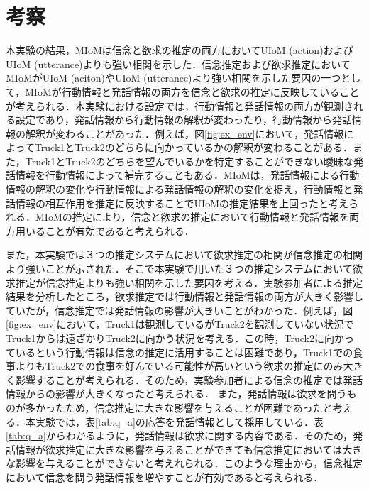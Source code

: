\chapter{考察}
\par
本実験の結果，MIoMは信念と欲求の推定の両方においてUIoM (action)およびUIoM (utterance)よりも強い相関を示した．信念推定および欲求推定においてMIoMがUIoM (aciton)やUIoM (utterance)より強い相関を示した要因の一つとして，MIoMが行動情報と発話情報の両方を信念と欲求の推定に反映していることが考えられる．本実験における設定では，行動情報と発話情報の両方が観測される設定であり，発話情報から行動情報の解釈が変わったり，行動情報から発話情報の解釈が変わることがあった．例えば，図\ref{fig:ex_env}において，発話情報によってTruck1とTruck2のどちらに向かっているかの解釈が変わることがある．また，Truck1とTruck2のどちらを望んでいるかを特定することができない曖昧な発話情報を行動情報によって補完することもある．MIoMは，発話情報による行動情報の解釈の変化や行動情報による発話情報の解釈の変化を捉え，行動情報と発話情報の相互作用を推定に反映することでUIoMの推定結果を上回ったと考えられる．MIoMの推定により，信念と欲求の推定において行動情報と発話情報を両方用いることが有効であると考えられる．

\par
また，本実験では３つの推定システムにおいて欲求推定の相関が信念推定の相関より強いことが示された．そこで本実験で用いた３つの推定システムにおいて欲求推定が信念推定よりも強い相関を示した要因を考える．実験参加者による推定結果を分析したところ，欲求推定では行動情報と発話情報の両方が大きく影響していたが，信念推定では発話情報の影響が大きいことがわかった．例えば，図\ref{fig:ex_env}において，Truck1は観測しているがTruck2を観測していない状況でTruck1からは遠ざかりTruck2に向かう状況を考える．この時，Truck2に向かっているという行動情報は信念の推定に活用することは困難であり，Truck1での食事よりもTruck2での食事を好んでいる可能性が高いという欲求の推定にのみ大きく影響することが考えられる．そのため，実験参加者による信念の推定では発話情報からの影響が大きくなったと考えられる．
また，発話情報は欲求を問うものが多かったため，信念推定に大きな影響を与えることが困難であったと考える．本実験では，表\ref{tab:q_a}の応答を発話情報として採用している．表\ref{tab:q_a}からわかるように，発話情報は欲求に関する内容である．そのため，発話情報が欲求推定に大きな影響を与えることができても信念推定においては大きな影響を与えることができないと考えれられる．このような理由から，信念推定において信念を問う発話情報を増やすことが有効であると考えられる．
